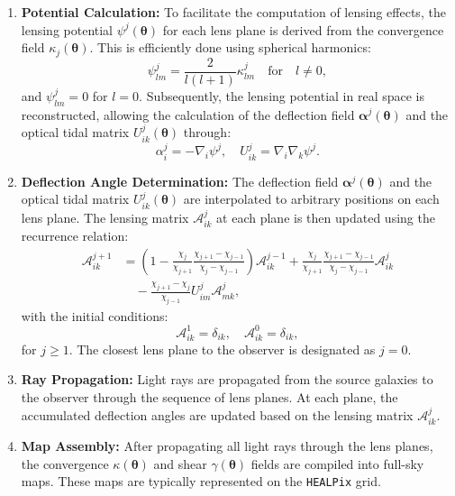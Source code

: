 \begin{enumerate}
    \item \textbf{Potential Calculation:} 
    To facilitate the computation of lensing effects, the lensing potential $\psi^j(\boldsymbol{\theta})$ for each lens plane is derived from the convergence field $\kappa_j(\boldsymbol{\theta})$. This is efficiently done using spherical harmonics:
    \begin{equation}
        \psi_{lm}^j = \frac{2}{l(l+1)} \kappa_{lm}^j \quad \text{for} \quad l \neq 0,
    \end{equation}
    and $\psi_{lm}^j = 0$ for $l = 0$. Subsequently, the lensing potential in real space is reconstructed, allowing the calculation of the deflection field $\boldsymbol{\alpha}^j(\boldsymbol{\theta})$ and the optical tidal matrix $U_{ik}^j(\boldsymbol{\theta})$ through:
    \begin{equation}
        \alpha_i^j = -\nabla_i \psi^j, \quad U_{ik}^j = \nabla_i \nabla_k \psi^j.
    \end{equation}

    \item \textbf{Deflection Angle Determination:} 
        The deflection field $\boldsymbol{\alpha}^j(\boldsymbol{\theta})$ and the optical tidal matrix $U_{ik}^j(\boldsymbol{\theta})$ are interpolated to arbitrary positions on each lens plane. The lensing matrix $\mathcal{A}^j_{ik}$ at each plane is then updated using the recurrence relation:
        \begin{equation}
            \begin{aligned}
                \mathcal{A}_{i k}^{j+1} & = \left(1 - \frac{\chi_j}{\chi_{j+1}} \frac{\chi_{j+1} - \chi_{j-1}}{\chi_j - \chi_{j-1}} \right) \mathcal{A}_{i k}^{j-1} + \frac{\chi_j}{\chi_{j+1}} \frac{\chi_{j+1} - \chi_{j-1}}{\chi_j - \chi_{j-1}} \mathcal{A}_{i k}^j \\
                & \quad - \frac{\chi_{j+1} - \chi_j}{\chi_{j-1}} U_{i m}^j \mathcal{A}_{m k}^j,
            \end{aligned}
        \end{equation}
        with the initial conditions:
        \begin{equation}
            \mathcal{A}_{i k}^1 = \delta_{i k}, \quad \mathcal{A}_{i k}^0 = \delta_{i k},
        \end{equation}
    for $j \geq 1$. The closest lens plane to the observer is designated as $j = 0$.

    \item \textbf{Ray Propagation:} 
    Light rays are propagated from the source galaxies to the observer through the sequence of lens planes. At each plane, the accumulated deflection angles are updated based on the lensing matrix $\mathcal{A}^j_{ik}$. 

    \item \textbf{Map Assembly:} 
    After propagating all light rays through the lens planes, the convergence $\kappa(\boldsymbol{\theta})$ and shear $\gamma(\boldsymbol{\theta})$ fields are compiled into full-sky maps. These maps are typically represented on the \texttt{HEALPix} grid.
\end{enumerate}

